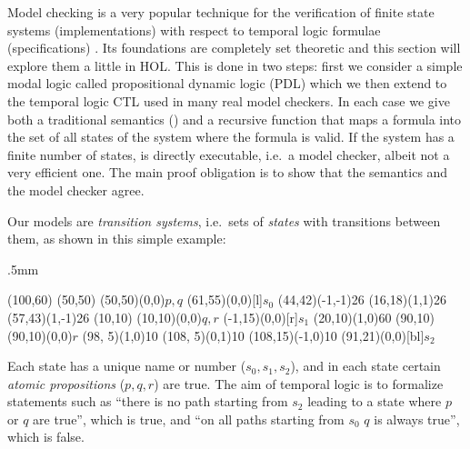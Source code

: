 %
\begin{isabellebody}%
\def\isabellecontext{Base}%
%
%
\begin{isamarkuptext}%
\label{sec:VMC}
Model checking is a very popular technique for the verification of finite
state systems (implementations) with respect to temporal logic formulae
(specifications) \cite{ClarkeGP-book,Huth-Ryan-book}. Its foundations are completely set theoretic
and this section will explore them a little in HOL\@. This is done in two steps: first
we consider a simple modal logic called propositional dynamic
logic (PDL) which we then extend to the temporal logic CTL used in many real
model checkers. In each case we give both a traditional semantics (\isa{{\isasymTurnstile}}) and a
recursive function  that maps a formula into the set of all states of
the system where the formula is valid. If the system has a finite number of
states,  is directly executable, i.e.\ a model checker, albeit not a
very efficient one. The main proof obligation is to show that the semantics
and the model checker agree.

\underscoreon

Our models are \emph{transition systems}, i.e.\ sets of \emph{states} with
transitions between them, as shown in this simple example:
\begin{center}
\unitlength.5mm
\thicklines
\begin{picture}(100,60)
\put(50,50){}
\put(50,50){\makebox(0,0){$p,q$}}
\put(61,55){\makebox(0,0)[l]{$s_0$}}
\put(44,42){\vector(-1,-1){26}}
\put(16,18){\vector(1,1){26}}
\put(57,43){\vector(1,-1){26}}
\put(10,10){}
\put(10,10){\makebox(0,0){$q,r$}}
\put(-1,15){\makebox(0,0)[r]{$s_1$}}
\put(20,10){\vector(1,0){60}}
\put(90,10){}
\put(90,10){\makebox(0,0){$r$}}
\put(98, 5){\line(1,0){10}}
\put(108, 5){\line(0,1){10}}
\put(108,15){\vector(-1,0){10}}
\put(91,21){\makebox(0,0)[bl]{$s_2$}}
\end{picture}
\end{center}
Each state has a unique name or number ($s_0,s_1,s_2$), and in each
state certain \emph{atomic propositions} ($p,q,r$) are true.
The aim of temporal logic is to formalize statements such as ``there is no
path starting from $s_2$ leading to a state where $p$ or $q$
are true'', which is true, and ``on all paths starting from $s_0$ $q$ is always true'',
which is false.


\end{isamarkuptext}
\end{isabellebody}
